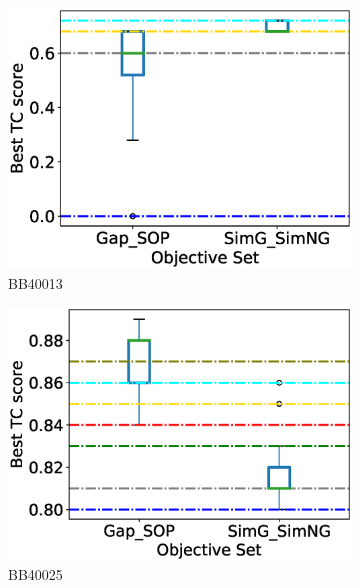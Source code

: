 \begin{figure}[!htbp]
\begin{adjustwidth}{-1cm}{-1cm}
\begin{subfigure}{0.22\textwidth}
			\includegraphics[width=\columnwidth]{Figure/summary/precomputedInit/Balibase/BB40013_objset_tc_rank_2}
			\caption{BB40013}
		\end{subfigure}
		\begin{subfigure}{0.22\textwidth}
			\includegraphics[width=\columnwidth]{Figure/summary/precomputedInit/Balibase/BB40025_objset_tc_rank_2}
			\caption{BB40025}
		\end{subfigure}
		\begin{subfigure}{0.22\textwidth}

\end{subfigure}
\end{adjustwidth}
\end{figure}
